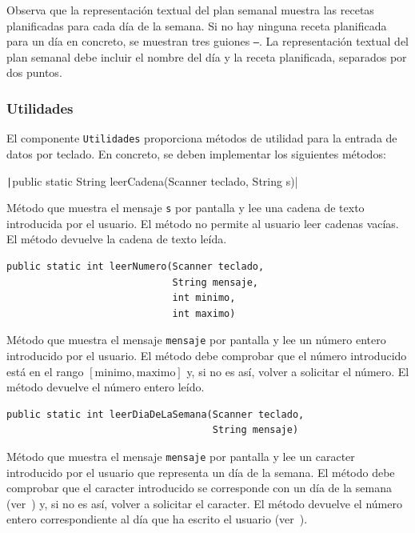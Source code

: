 \documentclass[
    a4paper, %
    12pt, %
]{CSSullivanBusinessReport}
\begin{document}
Observa que la representación textual del plan semanal muestra las recetas planificadas para cada día de la semana. Si no hay ninguna receta planificada para un día en concreto, se muestran tres guiones \texttt{---}. La representación textual del plan semanal debe incluir el nombre del día y la receta planificada, separados por dos puntos.

\subsubsection{Utilidades}\label{sec:utilidades}

El componente \texttt{Utilidades} proporciona métodos de utilidad para la entrada de datos por teclado. En concreto, se deben implementar los siguientes métodos:

\texttt|public static String leerCadena(Scanner teclado, String s)|

Método que muestra el mensaje \texttt{s} por pantalla y lee una cadena de texto introducida por el usuario. El método no permite al usuario leer cadenas vacías. El método devuelve la cadena de texto leída.

\begin{verbatim}
public static int leerNumero(Scanner teclado,
                             String mensaje,
                             int minimo,
                             int maximo)
\end{verbatim}

Método que muestra el mensaje \texttt{mensaje} por pantalla y lee un número entero introducido por el usuario. El método debe comprobar que el número introducido está en el rango \(\left [\mathrm{minimo},\mathrm{maximo}\right ]\) y, si no es así, volver a solicitar el número. El método devuelve el número entero leído.

\begin{verbatim}
public static int leerDiaDeLaSemana(Scanner teclado,
                                    String mensaje)
\end{verbatim}

Método que muestra el mensaje \texttt{mensaje} por pantalla y lee un caracter introducido por el usuario que representa un día de la semana. El método debe comprobar que el caracter introducido se corresponde con un día de la semana (ver~) y, si no es así, volver a solicitar el caracter. El método devuelve el número entero correspondiente al día que ha escrito el usuario (ver~).
\end{document}
